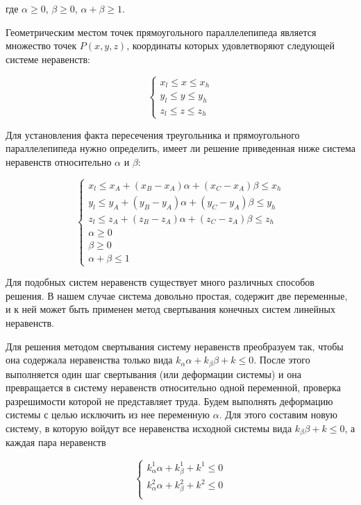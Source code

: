\documentclass[
11pt,%
tightenlines,%
twoside,%
onecolumn,%
nofloats,%
nobibnotes,%
nofootinbib,%
superscriptaddress,%
noshowpacs,%
centertags]%
{revtex4}
\begin{document}
где $\alpha \ge 0$, $\beta \ge 0$, $\alpha + \beta \ge 1$.

Геометрическим местом точек прямоугольного параллелепипеда является множество точек $P(x, y, z)$, координаты которых удовлетворяют следующей системе неравенств:

\begin{equation}
\begin{cases}
x_l \le x \le x_h \\
y_l \le y \le y_h \\
z_l \le z \le z_h
\end{cases}
\end{equation}

Для установления факта пересечения треугольника и прямоугольного параллелепипеда нужно определить, имеет ли решение приведенная ниже система неравенств относительно $\alpha$ и $\beta$:

\begin{equation}
\begin{cases}
x_l \le x_A + (x_B - x_A)\alpha + (x_C - x_A)\beta \le x_h \\
y_l \le y_A + (y_B - y_A)\alpha + (y_C - y_A)\beta \le y_h \\
z_l \le z_A + (z_B - z_A)\alpha + (z_C - z_A)\beta \le z_h \\
\alpha \ge 0 \\
\beta \ge 0 \\
\alpha + \beta \le 1
\end{cases}
\end{equation}

Для подобных систем неравенств существует много различных способов решения.
В нашем случае система довольно простая, содержит две переменные, и к ней может быть применен метод свертывания конечных систем линейных неравенств.

Для решения методом свертывания систему неравенств преобразуем так, чтобы она содержала неравенства только вида $k_{\alpha}\alpha + k_{\beta}\beta + k \le 0$.
После этого выполняется один шаг свертывания (или деформации системы) и она превращается в систему неравенств относительно одной переменной, проверка разрешимости которой не представляет труда.
Будем выполнять деформацию системы с целью исключить из нее переменную $\alpha$.
Для этого составим новую систему, в которую войдут все неравенства исходной системы вида $k_{\beta}\beta + k \le 0$, а каждая пара неравенств

\begin{equation}
\begin{cases}
k_{\alpha}^1 \alpha + k_{\beta}^1 + k^1 \le 0 \\
k_{\alpha}^2 \alpha + k_{\beta}^2 + k^2 \le 0 \\
\end{cases}
\end{equation}
\end{document}
